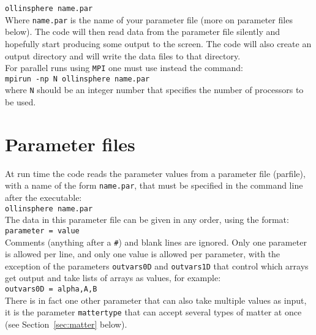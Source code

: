 \documentclass[12pt]{article}
\begin{document}
\texttt{ollinsphere name.par} \\

Where \texttt{name.par} is the name of your parameter file (more on
parameter files below).  The code will then read data from the
parameter file silently and hopefully start producing some output to
the screen. The code will also create an output directory and will
write the data files to that directory. \\

For parallel runs using \texttt{MPI} one must use instead the command:
\\

\texttt{mpirun -np N ollinsphere name.par} \\

where \texttt{N} should be an integer number that specifies the number
of processors to be used. \\



\section{Parameter files}
\label{sec:parfiles}

At run time the code reads the parameter values from a parameter file
(parfile), with a name of the form \texttt{name.par}, that must be
specified in the command line after the executable: \\

\texttt{ollinsphere  name.par} \\

The data in this parameter file can be given in any order, using the
format: \\

\texttt{parameter = value} \\

Comments (anything after a \texttt{\#}) and blank lines are ignored.
Only one parameter is allowed per line, and only one value is allowed
per parameter, with the exception of the parameters \texttt{outvars0D}
and \texttt{outvars1D} that control which arrays get output and take
lists of arrays as values, for example: \\

\texttt{outvars0D = alpha,A,B} \\

There is in fact one other parameter that can also take multiple
values as input, it is the parameter \texttt{mattertype} that can
accept several types of matter at once (see Section~\ref{sec:matter}
below).\\
\end{document}
